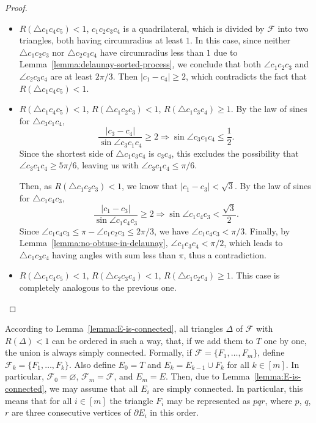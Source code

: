 \begin{appendices}
\begin{proof}
\begin{itemize}
    \item $R(\triangle c_1c_4c_5) < 1$, $c_1c_2c_3c_4$ is a quadrilateral, which is divided by $\mathcal{F}$ into two triangles, both having circumradius at least $1$. In this case, since neither $\triangle c_1c_2c_3$ nor $\triangle c_2c_3c_4$ have circumradius less than $1$ due to Lemma~\ref{lemma:delaunay-sorted-process}, we conclude that both $\angle c_1c_2c_3$ and $\angle c_2c_3c_4$ are at least $2\pi/3$. Then $|c_1 - c_4|\geq 2$, which contradicts the fact that $R(\triangle c_1c_4c_5) < 1$.
    
    \item $R(\triangle c_1c_4c_5) < 1$, $R(\triangle c_1c_2c_3) < 1$, $R(\triangle c_1c_3c_4)\geq 1$. By the law of sines for $\triangle c_3c_1c_4$,
    $$\frac{|c_3 - c_4|}{\sin\angle c_3c_1c_4} \geq 2 \Rightarrow \sin\angle c_3c_1c_4\leq\frac12.$$
    Since the shortest side of $\triangle c_1c_3c_4$ is $c_3c_4$, this excludes the possibility that $\angle c_3c_1c_4\geq5\pi/6$, leaving us with $\angle c_3c_1c_4\leq\pi/6$.
    
    Then, as $R(\triangle c_1c_2c_3) < 1$, we know that $|c_1 - c_3| < \sqrt{3}$. By the law of sines for $\triangle c_1c_4c_3$,
    $$\frac{|c_1 - c_3|}{\sin\angle c_1c_4c_3} \geq 2 \Rightarrow \sin\angle c_1c_4c_3 < \frac{\sqrt 3}{2}.$$ Since $\angle c_1c_4c_3\leq \pi - \angle c_1c_2c_3\leq2\pi/3$, we have $\angle c_1c_4c_3 < \pi/3$. Finally, by Lemma~\ref{lemma:no-obtuse-in-delaunay}, $\angle c_1c_3c_4 < \pi/2$, which leads to $\triangle c_1c_3c_4$ having angles with sum less than $\pi$, thus a contradiction.
    
    \item $R(\triangle c_1c_4c_5) < 1$, $R(\triangle c_2c_3c_4) < 1$, $R(\triangle c_1c_2c_4)\geq 1$. This case is completely analogous to the previous one.
\end{itemize}
\end{proof}

According to Lemma~\ref{lemma:E-is-connected}, all triangles $\Delta$ of $\mathcal{F}$ with $R(\Delta) < 1$ can be ordered in such a way, that, if we add them to $T$ one by one, the union is always simply connected. Formally, if $\mathcal{F} = \{F_1, \ldots, F_m\}$, define $\mathcal{F}_k = \{F_1, \ldots, F_k\}$. Also define $E_0 = T$ and $E_k = E_{k-1}\cup F_k$ for all $k\in[m]$. In particular, $\mathcal{F}_0 = \varnothing$, $\mathcal{F}_m = \mathcal{F}$, and $E_m = E$. Then, due to Lemma~\ref{lemma:E-is-connected}, we may assume that all $E_i$ are simply connected. In particular, this means that for all $i\in[m]$ the triangle $F_i$ may be represented as $pqr$, where $p$, $q$, $r$ are three consecutive vertices of $\partial E_i$ in this order.


\end{appendices}
